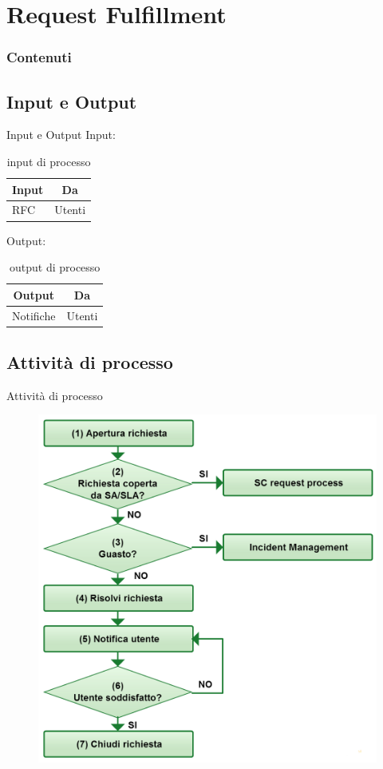 %
\section{Request Fulfillment}
\frame
{
\frametitle{Contenuti}
\tableofcontents[currentsection]
}

\subsection*{Input e Output}
\begin{frame}{Input e Output}
Input:
\begin{table}
\begin{tabular}{ l | c }
\textbf{Input} & \textbf{Da}\\
\hline
RFC & Utenti\\
\end{tabular}
\caption{input di processo}
\end{table}
Output:
\begin{table}
\begin{tabular}{ c | c }
\textbf{Output} & \textbf{Da}\\
\hline
Notifiche & Utenti\\
\end{tabular}
\caption{output di processo}
\end{table}
\end{frame}

\subsection*{Attività di processo}
\begin{frame}{Attività di processo}
\begin{figure}
\includegraphics[scale=0.22]{Images/Request_fulfillment.png}
\end{figure}
\end{frame}